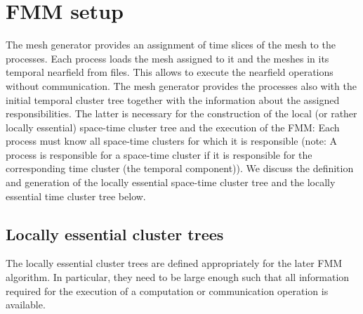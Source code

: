 \documentclass[a4paper,11pt]{article}
\theoremstyle{plain}
\theoremstyle{definition}
\theoremstyle{remark}
\begin{document}
\section{FMM setup}
The mesh generator provides an assignment of time slices of the mesh to the processes. Each process loads the mesh assigned to it and the meshes in its temporal nearfield from files. This allows to execute the nearfield operations without communication. The mesh generator provides the processes also with the initial temporal cluster tree together with the information about the assigned responsibilities. The latter is necessary for the construction of the local (or rather locally essential) space-time cluster tree and the execution of the FMM: Each process must know all space-time clusters for which it is responsible (note: A process is responsible for a space-time cluster if it is responsible for the corresponding time cluster (the temporal component)). We discuss the definition and generation of the locally essential space-time cluster tree and the locally essential time cluster tree below.


\subsection{Locally essential cluster trees} \label{sec:loc_ess_cluster_tree}
The locally essential cluster trees are defined appropriately for the later FMM algorithm. In particular, they need to be large enough such that all information required for the execution of a computation or communication operation is available.
\end{document}
